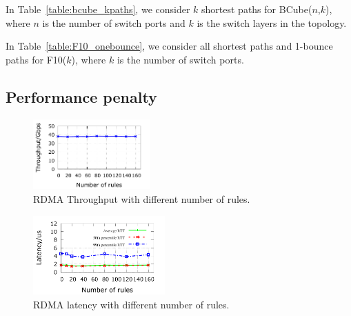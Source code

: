 In Table~\ref{table:bcube_kpaths}, we consider $k$ shortest paths for BCube($n$,$k$), where $n$ is the number of switch ports and $k$ is the switch layers in the topology.

\begin{table}[t]
	\centering
	\caption{F10 with shortest paths and 1-bounce paths.}
	\label{table:F10_onebounce}
\end{table}

In Table~\ref{table:F10_onebounce}, we consider all shortest paths and 1-bounce paths for F10($k$), where $k$ is the number of switch ports.

\subsection{Performance penalty}\label{subsec:exp_performanceoverhead}

\begin{figure}
	\centering
	\includegraphics[width=0.4\textwidth] {figs/overhead_avgthrpt}
	\caption{RDMA Throughput with different number of rules.}\label{fig:thrpt_overhead}
\end{figure}

\begin{figure}
	\centering
	\includegraphics[width=0.45\textwidth] {figs/RDMAlatency_overhead}
	\caption{RDMA latency with different number of rules.}\label{fig:latency_overhead}
\end{figure}

